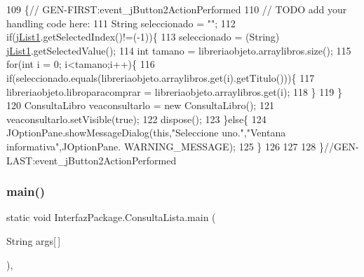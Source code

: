 \begin{DoxyCode}
109                                                                          \{\textcolor{comment}{//
      GEN-FIRST:event\_jButton2ActionPerformed}
110         \textcolor{comment}{// TODO add your handling code here:}
111         String seleccionado = \textcolor{stringliteral}{""};
112         \textcolor{keywordflow}{if}(\mbox{\hyperlink{class_interfaz_package_1_1_consulta_lista_af64dea173f739368a8fe9049edfdd9f0}{jList1}}.getSelectedIndex()!=(-1))\{
113             seleccionado = (String) \mbox{\hyperlink{class_interfaz_package_1_1_consulta_lista_af64dea173f739368a8fe9049edfdd9f0}{jList1}}.getSelectedValue();
114             \textcolor{keywordtype}{int} tamano = libreriaobjeto.arraylibros.size();
115             \textcolor{keywordflow}{for}(\textcolor{keywordtype}{int} i = 0; i<tamano;i++)\{
116                  \textcolor{keywordflow}{if}(seleccionado.equals(libreriaobjeto.arraylibros.get(i).getTitulo()))\{
117                        libreriaobjeto.libroparacomprar = libreriaobjeto.arraylibros.get(i);
118                  \}
119         \}
120             ConsultaLibro veaconsultarlo = \textcolor{keyword}{new} ConsultaLibro();
121             veaconsultarlo.setVisible(\textcolor{keyword}{true});
122             dispose();
123         \}\textcolor{keywordflow}{else}\{
124             JOptionPane.showMessageDialog(\textcolor{keyword}{this},\textcolor{stringliteral}{"Seleccione uno."},\textcolor{stringliteral}{"Ventana informativa"},JOptionPane.
      WARNING\_MESSAGE);
125         \}
126         
127         
128     \}\textcolor{comment}{//GEN-LAST:event\_jButton2ActionPerformed}
\end{DoxyCode}
\mbox{\label{class_interfaz_package_1_1_consulta_lista_a2826ed220b0d839325569014a77e1bde}} 
\subsubsection{\texorpdfstring{main()}{main()}}
{\footnotesize\ttfamily static void Interfaz\+Package.\+Consulta\+Lista.\+main (\begin{DoxyParamCaption}\item[{String}]{args\mbox{[}$\,$\mbox{]} }\end{DoxyParamCaption})\hspace{0.3cm}{\ttfamily [inline]}, {\ttfamily [static]}}



